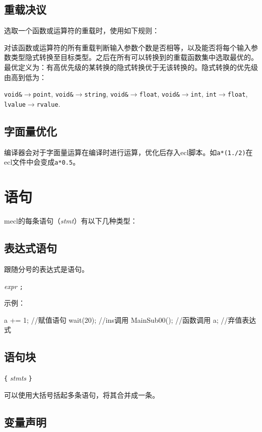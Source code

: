 \documentclass[UTF8]{ctexart}
\begin{document}
\subsection{重载决议}
\label{chongzai}

选取一个函数或运算符的重载时，使用如下规则：

对该函数或运算符的所有重载判断输入参数个数是否相等，以及能否将每个输入参数类型隐式转换至目标类型。之后在所有可以转换到的重载函数集中选取最优的。最优定义为：有高优先级的某转换的隐式转换优于无该转换的。隐式转换的优先级由高到低为：

\verb|void&|$\to$\verb|point|, \verb|void&|$\to$\verb|string|, \verb|void&|$\to$\verb|float|, \verb|void&|$\to$\verb|int|, \verb|int|$\to$\verb|float|, \verb|lvalue|$\to$\verb|rvalue|.

\subsection{字面量优化}

编译器会对于字面量运算在编译时进行运算，优化后存入ecl脚本。如\verb|a*(1./2)|在ecl文件中会变成\verb|a*0.5|。

\section{语句}
\label{yuju}

mecl的每条语句（\textit{stmt}）有以下几种类型：

\subsection{表达式语句}

跟随分号的表达式是语句。

\textit{expr} \verb|;|

示例：

\begin{MUAvbt}
a += 1;		//赋值语句
wait(20);		//ins调用
MainSub00();		//函数调用
a;		//弃值表达式
\end{MUAvbt}

\subsection{语句块}

\verb|{| \textit{stmts} \verb|}|

可以使用大括号括起多条语句，将其合并成一条。

\subsection{变量声明}
\end{document}
